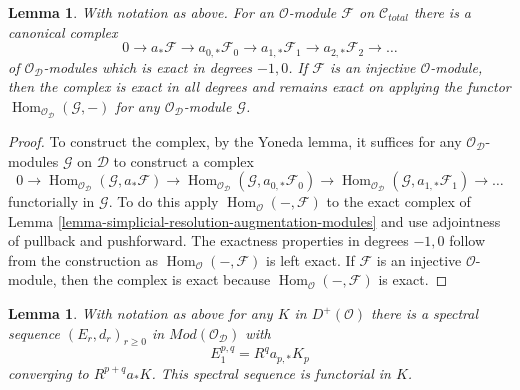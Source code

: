 \documentclass{stacks-project}
\theoremstyle{plain}
\newtheorem{lemma}[subsection]{Lemma}
\theoremstyle{definition}
\theoremstyle{remark}
\numberwithin{equation}{subsection}
\def\Hom{\mathop{\mathrm{Hom}}\nolimits}
\begin{document}
\begin{lemma}
\label{lemma-augmentation-cech-complex-modules}
With notation as above.
For an $\mathcal{O}$-module $\mathcal{F}$ on $\mathcal{C}_{total}$
there is a canonical complex
$$
0 \to a_*\mathcal{F} \to a_{0, *}\mathcal{F}_0 \to a_{1, *}\mathcal{F}_1 \to
a_{2, *}\mathcal{F}_2 \to \ldots
$$
of $\mathcal{O}_\mathcal{D}$-modules which is exact in degrees $-1, 0$.
If $\mathcal{F}$ is an injective $\mathcal{O}$-module, then the complex
is exact in all degrees and remains exact on applying the functor
$\Hom_{\mathcal{O}_\mathcal{D}}(\mathcal{G}, -)$ for any
$\mathcal{O}_\mathcal{D}$-module $\mathcal{G}$.
\end{lemma}

\begin{proof}
To construct the complex, by the Yoneda lemma, it suffices for any
$\mathcal{O}_\mathcal{D}$-modules $\mathcal{G}$ on $\mathcal{D}$
to construct a complex
$$
0 \to \Hom_{\mathcal{O}_\mathcal{D}}(\mathcal{G}, a_*\mathcal{F}) \to
\Hom_{\mathcal{O}_\mathcal{D}}(\mathcal{G}, a_{0, *}\mathcal{F}_0) \to
\Hom_{\mathcal{O}_\mathcal{D}}(\mathcal{G}, a_{1, *}\mathcal{F}_1) \to \ldots
$$
functorially in $\mathcal{G}$. To do this apply
$\Hom_\mathcal{O}(-, \mathcal{F})$
to the exact complex of
Lemma \ref{lemma-simplicial-resolution-augmentation-modules}
and use adjointness of pullback and pushforward.
The exactness properties in degrees $-1, 0$ follow from
the construction as $\Hom_\mathcal{O}(-, \mathcal{F})$ is left exact.
If $\mathcal{F}$ is an injective $\mathcal{O}$-module, then the
complex is exact because $\Hom_\mathcal{O}(-, \mathcal{F})$ is exact.
\end{proof}

\begin{lemma}
\label{lemma-augmentation-spectral-sequence-modules}
With notation as above for any $K$ in $D^+(\mathcal{O})$ there is a spectral
sequence $(E_r, d_r)_{r \geq 0}$ in $\textit{Mod}(\mathcal{O}_\mathcal{D})$
with
$$
E_1^{p, q} = R^qa_{p, *} K_p
$$
converging to $R^{p + q}a_*K$. This spectral sequence is functorial in $K$.
\end{lemma}
\end{document}
